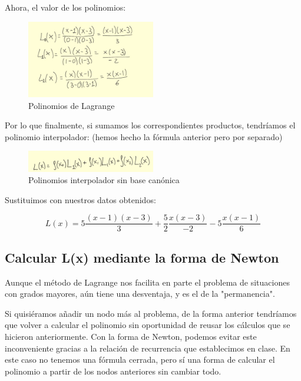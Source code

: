 \documentclass{article}
\begin{document}
Ahora, el valor de los polinomios:

\begin{figure}[h]
  \center
  \includegraphics[width=0.5\textwidth]{src/lagrangelis.jpg}
  \caption{Polinomios de Lagrange}
\end{figure}

Por lo que finalmente, si sumamos los correspondientes productos, tendríamos el polinomio interpolador: (hemos hecho la fórmula anterior pero por separado)

\begin{figure}[h]
  \center
  \includegraphics[width=0.5\textwidth]{src/lagrangelx.jpg}
  \caption{Polinomios interpolador sin base canónica}
\end{figure}

Sustituimos con nuestros datos obtenidos:

\begin{equation}
  L(x) = 5 \frac{(x - 1)(x - 3)}{3} + \frac{5}{2} \frac{x(x - 3)}{-2} - 5 \frac{x(x - 1)}{6}
\end{equation}

\subsection{Calcular L(x) mediante la forma de Newton}

Aunque el método de Lagrange nos facilita en parte el problema de situaciones con grados mayores, aún tiene una desventaja, y es el de la "permanencia".

Si quisiéramos añadir un nodo más al problema, de la forma anterior tendríamos que volver a calcular el polinomio sin oportunidad de reusar los cálculos que se hicieron anteriormente. Con la forma de Newton, podemos evitar este inconveniente gracias a la relación de recurrencia que establecimos en clase. En este caso no tenemos una fórmula cerrada, pero sí una forma de calcular el polinomio a partir de los nodos anteriores sin cambiar todo.
\end{document}
